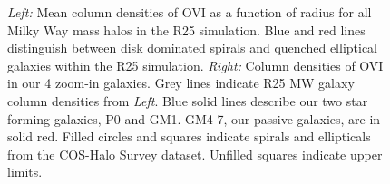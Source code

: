 \documentclass[]{emulateapj}
\begin{document}
\begin{figure}[ht!]
\centerline{
}
\caption[]{\textit{Left:} Mean column densities of OVI as a function of radius for all Milky Way mass halos in the R25 simulation. Blue and red lines distinguish between disk dominated spirals and quenched elliptical galaxies within the R25 simulation. \textit{Right:} Column densities of OVI in our 4 zoom-in galaxies. Grey lines indicate R25 MW galaxy column densities from \textit{Left}. Blue solid lines describe our two star forming galaxies, P0 and GM1. GM4-7, our passive galaxies, are in solid red. Filled circles and squares indicate spirals and ellipticals from the COS-Halo Survey dataset. Unfilled squares indicate upper limits.}
\label{figure:ROM_Novi_vs_b}
\end{figure}
\end{document}
